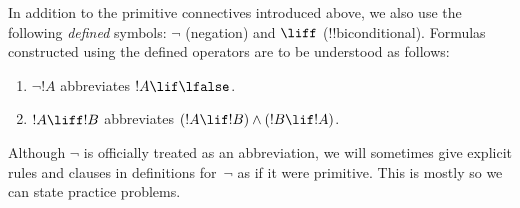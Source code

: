 \documentclass[../../../include/open-logic-section]{subfiles}
\begin{document}
In addition to the primitive connectives introduced above, we also use
the following \emph{defined} symbols: $\lnot$ (negation) and $\liff$
(!!{biconditional}).  Formulas constructed using the defined operators
are to be understood as follows:
\begin{enumerate}
\item $\lnot !A$ abbreviates $!A \lif \lfalse$.

\item $!A \liff !B$ abbreviates $(!A \lif !B) \land (!B
  \lif !A)$.
\end{enumerate}

Although $\lnot$ is officially treated as an abbreviation, we will
sometimes give explicit rules and clauses in definitions for~$\lnot$
as if it were primitive. This is mostly so we can state practice
problems.
\end{document}
